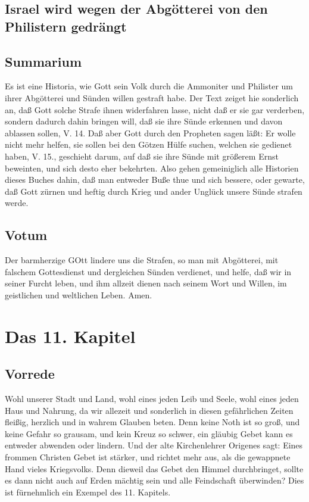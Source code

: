 \section[Israel wird wegen der Abgötterei von den Philistern]{Israel wird wegen der Abgötterei von den Philistern gedrängt}
\section{Summarium}

Es ist eine Historia, wie Gott sein Volk durch die Ammoniter und Philister um ihrer Abgötterei und Sünden willen gestraft habe. Der Text zeiget hie sonderlich an, daß Gott solche Strafe ihnen widerfahren lasse, nicht daß er sie gar verderben, sondern dadurch dahin bringen will, daß sie ihre Sünde erkennen und davon ablassen sollen, V. 14. Daß aber Gott durch den Propheten sagen läßt: Er wolle nicht mehr helfen, sie sollen bei den Götzen Hülfe suchen, welchen sie gedienet haben, V. 15., geschieht darum, auf daß sie ihre Sünde mit größerem Ernst beweinten, und sich desto eher bekehrten. Also gehen gemeiniglich alle Historien dieses Buches dahin, daß man entweder Buße thue und sich bessere, oder gewarte, daß Gott zürnen und heftig durch Krieg und ander Unglück unsere Sünde strafen werde.

\section{Votum}

Der barmherzige GOtt lindere uns die Strafen, so man mit Abgötterei, mit falschem Gottesdienst und dergleichen Sünden verdienet, und helfe, daß wir in seiner Furcht leben, und ihm allzeit dienen nach seinem Wort und Willen, im geistlichen und weltlichen Leben. Amen.

\chapter{Das 11. Kapitel}

\section{Vorrede}

Wohl unserer Stadt und Land, wohl eines jeden Leib und Seele, wohl eines jeden Haus und Nahrung, da wir allezeit und sonderlich in diesen gefährlichen Zeiten fleißig, herzlich und in wahrem Glauben beten. Denn keine Noth ist so groß, und keine Gefahr so grausam, und kein Kreuz so schwer, ein gläubig Gebet kann es entweder abwenden oder lindern. Und der alte Kirchenlehrer Origenes sagt: Eines frommen Christen Gebet ist stärker, und richtet mehr aus, als die gewappnete Hand vieles Kriegsvolks. Denn dieweil das Gebet den Himmel durchbringet, sollte es dann nicht auch auf Erden mächtig sein und alle Feindschaft überwinden? Dies ist fürnehmlich ein Exempel des 11. Kapitels.


